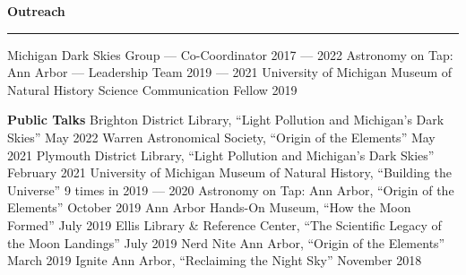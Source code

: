 \documentclass[10pt]{article}
\newcommand{\header}[1]{\vspace{2em}\par \textbf{\large #1}\strut\hrule\vspace{0em}}
\newcommand{\actionHeader}[2]{\textbf{#1 \hfill #2}}
\newcommand{\justifiedItemDate}[2]{\newline\null#1 \hfill #2}
\newcommand{\justifiedItemDateFirst}[2]{#1 \hfill #2}
\newcommand{\indentedItem}[1]{\newline\null\qquad #1}
\begin{document}








\header{Outreach}
\justifiedItemDateFirst{Michigan Dark Skies Group --- Co-Coordinator}{2017 --- 2022}
\justifiedItemDate{Astronomy on Tap: Ann Arbor --- Leadership Team}{2019 --- 2021}
\justifiedItemDate{University of Michigan Museum of Natural History Science Communication Fellow}{2019}

{\actionHeader{Public Talks}{}}
\justifiedItemDate{Brighton District Library, ``Light Pollution and Michigan's Dark Skies'' }{May 2022}
\justifiedItemDate{Warren Astronomical Society, ``Origin of the Elements''}{May 2021}
\justifiedItemDate{Plymouth District Library, ``Light Pollution and Michigan's Dark Skies''}{February 2021}
\justifiedItemDate{University of Michigan Museum of Natural History, ``Building the Universe''}{9 times in 2019 --- 2020}
\justifiedItemDate{Astronomy on Tap: Ann Arbor, ``Origin of the Elements''}{October 2019}
\justifiedItemDate{Ann Arbor Hands-On Museum, ``How the Moon Formed''}{July 2019}
\justifiedItemDate{Ellis Library \& Reference Center, ``The Scientific Legacy of the Moon Landings''}{July 2019}
\justifiedItemDate{Nerd Nite Ann Arbor, ``Origin of the Elements''}{March 2019}
\justifiedItemDate{Ignite Ann Arbor, ``Reclaiming the Night Sky''}{November 2018}
\end{document}
